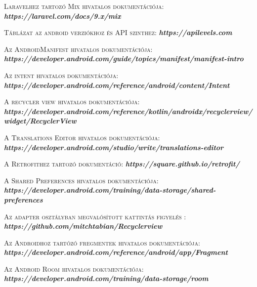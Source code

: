\documentclass[
]{thesis-ekf}
\theoremstyle{definition}
\theoremstyle{remark}
\begin{document}
\begin{thebibliography}{2}
		\textsc{Laravelhez tartozó Mix hivatalos dokumentációja:}
		\newline
		\emph{\bf{https://laravel.com/docs/9.x/mix}}
		
		\textsc{Táblázat az android verziókhoz és API szinthez:}
		\newline
		\emph{\bf{https://apilevels.com}}
		
		\textsc{Az AndroidManifest hivatalos dokumentációja:}
		\newline
		\emph{\bf{https://developer.android.com/guide/topics/manifest/manifest-intro}}
		
		\textsc{Az intent hivatalos dokumentációja:}
		\newline
		\emph{\bf{https://developer.android.com/reference/android/content/Intent}}
		
		\textsc{A recycler view hivatalos dokumentációja:}
		\newline
		\emph{\bf{https://developer.android.com/reference/kotlin/androidx/recyclerview/widget/RecyclerView}}
		
		\textsc{A Translations Editor hivatalos dokumentációja:}
		\newline
		\emph{\bf{https://developer.android.com/studio/write/translations-editor}}
		
		\textsc{A Retrofithez tartozó dokumentáció:}
		\newline
		\emph{\bf{https://square.github.io/retrofit/}}
		
		\textsc{A Shared Preferences hivatalos dokumentációja:}
		\newline
		\emph{\bf{https://developer.android.com/training/data-storage/shared-preferences}}
		
		\textsc{Az adapter osztályban megvalósított kattintás figyelés :}
		\newline
		\emph{\bf{https://github.com/mitchtabian/Recyclerview}}
		
		\textsc{Az Androidhoz tartózó fregmentek hivatalos dokumentációja:}
		\newline
		\emph{\bf{https://developer.android.com/reference/android/app/Fragment}}
		
		\textsc{Az Android Room hivatalos dokumentációja:}
		\newline
		\emph{\bf{https://developer.android.com/training/data-storage/room}}		
				
	\end{thebibliography}
	
	
\end{document}
